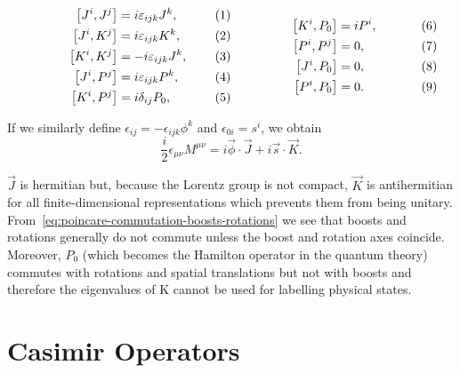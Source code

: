 \begin{subequations}
\label{eq:poincare-commutation-boosts-rotations}
\noindent\centering
    \begin{minipage}{0.48\textwidth}
        \begin{align}
        \comm{J^i}{J^j} &= i \epsilon_{ijk} J^k, \\
        \comm{J^i}{K^j} &= i \epsilon_{ijk} K^k ,\\
        \comm{K^i}{K^j} &= -i \epsilon_{ijk} J^k, \\
        \comm{J^i}{P^j} &= i \epsilon_{ijk} P^k ,\\
        \comm{K^i}{P^j} &= i \delta_{ij} P_0,
        \end{align}
    \end{minipage}
    \hfill
    \begin{minipage}{0.48\textwidth}
    \label{eq:bell_states}
        \begin{align}
        \comm{K^i}{P_0} &= i P^i ,\\
        \comm{P^i}{P^j} &= 0, \\
        \comm{J^i}{P_0} &= 0, \\
        \comm{P^i}{P_0} &= 0 .
        \end{align}
    \end{minipage}\bigskip
    \end{subequations}

If we similarly define $\epsilon_{ij} = - \epsilon_{ijk} \phi^k$ and $\epsilon_{0i} = s^i$, we obtain
\begin{equation}
    \frac{i}{2} \epsilon_{\mu\nu} M^{\mu\nu} = i \vec{\phi} \cdot \vec{J} + i \vec{s} \cdot \vec{K}.
\end{equation}

$\vec{J}$ is hermitian but, because the Lorentz group is not compact, $\vec{K}$ is antihermitian for all finite-dimensional representations which prevents them from being unitary. From~\eqref{eq:poincare-commutation-boosts-rotations} we see that boosts and rotations generally do not commute unless the boost and rotation axes coincide. Moreover, $P_0$ (which becomes the Hamilton operator in the quantum theory) commutes with rotations and spatial translations but not with boosts and therefore the eigenvalues of K cannot be used for labelling physical states.


\section{Casimir Operators}